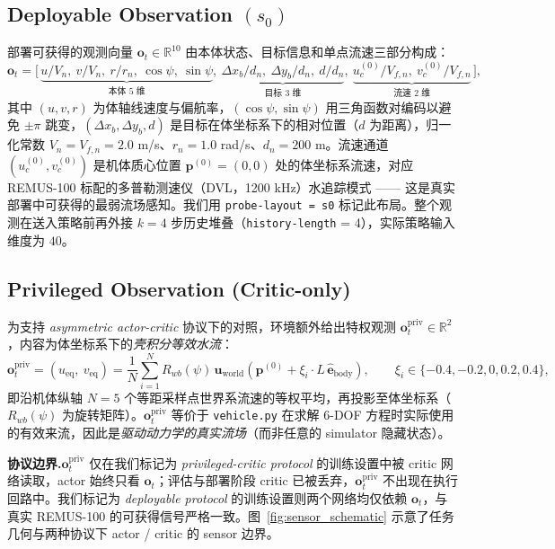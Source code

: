 \subsection{Deployable Observation $(s_0)$}\label{subsec:setup_obs_deployable}

部署可获得的观测向量 $\mathbf{o}_t \in \mathbb{R}^{10}$ 由本体状态、目标信息和单点流速三部分构成：
\begin{equation}
\mathbf{o}_t = \bigl[\,\underbrace{u/V_n,\ v/V_n,\ r/r_n,\ \cos\psi,\ \sin\psi}_{\text{本体 5 维}},\ \underbrace{\Delta x_b/d_n,\ \Delta y_b/d_n,\ d/d_n}_{\text{目标 3 维}},\ \underbrace{u_c^{(0)}/V_{f,n},\ v_c^{(0)}/V_{f,n}}_{\text{流速 2 维}}\,\bigr],
\end{equation}
其中 $(u, v, r)$ 为体轴线速度与偏航率，$(\cos\psi, \sin\psi)$ 用三角函数对编码以避免 $\pm\pi$ 跳变，$(\Delta x_b, \Delta y_b, d)$ 是目标在体坐标系下的相对位置（$d$ 为距离），归一化常数 $V_n = V_{f,n} = 2.0$ m/s、$r_n = 1.0$ rad/s、$d_n = 200$ m。流速通道 $(u_c^{(0)}, v_c^{(0)})$ 是机体质心位置 $\mathbf{p}^{(0)} = (0, 0)$ 处的体坐标系流速，对应 REMUS-100 标配的多普勒测速仪（DVL，1200 kHz）水追踪模式 —— 这是真实部署中可获得的最弱流场感知。我们用 \texttt{probe-layout = s0} 标记此布局。整个观测在送入策略前再外接 $k = 4$ 步历史堆叠（\texttt{history-length} = 4），实际策略输入维度为 $40$。

\subsection{Privileged Observation (Critic-only)}\label{subsec:setup_obs_privileged}

为支持 \emph{asymmetric actor-critic} \citep{pinto2017asymmetric} 协议下的对照，环境额外给出特权观测 $\mathbf{o}_t^{\mathrm{priv}} \in \mathbb{R}^2$，内容为体坐标系下的\emph{壳积分等效水流}：
\begin{equation}
\mathbf{o}_t^{\mathrm{priv}} = (u_{\mathrm{eq}},\ v_{\mathrm{eq}}) = \frac{1}{N}\sum_{i=1}^{N} R_{wb}(\psi)\,\mathbf{u}_{\mathrm{world}}\!\left(\mathbf{p}^{(0)} + \xi_i \cdot L\,\hat{\mathbf{e}}_{\mathrm{body}}\right),\qquad \xi_i \in \{-0.4, -0.2, 0, 0.2, 0.4\},
\label{eq:setup_priv_obs}
\end{equation}
即沿机体纵轴 $N = 5$ 个等距采样点世界系流速的等权平均，再投影至体坐标系（$R_{wb}(\psi)$ 为旋转矩阵）。$\mathbf{o}_t^{\mathrm{priv}}$ 等价于 \texttt{vehicle.py} 在求解 6-DOF 方程时实际使用的有效来流，因此是\emph{驱动动力学的真实流场}（而非任意的 simulator 隐藏状态）。

\textbf{协议边界.}\quad $\mathbf{o}_t^{\mathrm{priv}}$ 仅在我们标记为 \emph{privileged-critic protocol} 的训练设置中被 critic 网络读取，actor 始终只看 $\mathbf{o}_t$；评估与部署阶段 critic 已被丢弃，$\mathbf{o}_t^{\mathrm{priv}}$ 不出现在执行回路中。我们标记为 \emph{deployable protocol} 的训练设置则两个网络均仅依赖 $\mathbf{o}_t$，与真实 REMUS-100 的可获得信号严格一致。图~\ref{fig:sensor_schematic} 示意了任务几何与两种协议下 actor / critic 的 sensor 边界。

